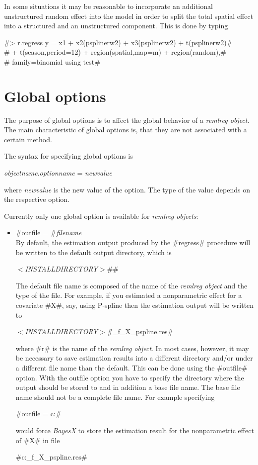 In some situations it may be reasonable to incorporate  an
additional unstructured  random effect into the model in order to
split the total spatial effect into a structured and an
unstructured component. This is done by typing

#> r.regress y = x1 + x2(psplinerw2) + x3(psplinerw2) + t(psplinerw2)#\\
#  + t(season,period=12) + region(spatial,map=m) + region(random),#\\
#  family=binomial using test#

\section{Global options}
\label{remlregglobopt} 

The purpose of global options is to affect the global behavior of
a {\em remlreg object}. The main characteristic of global options
is, that they are not associated with a certain method.

The syntax for specifying global options is

{\em objectname}.{\em optionname} = {\em newvalue}

where {\em newvalue} is the new value of the option. The type of
the value depends on the respective option.

Currently only one global option is available for {\em remlreg
objects}:

\begin{itemize}
\item #outfile = #{\em filename} \\
By default, the estimation output produced by the #regress#
procedure will be written to the default output directory, which
is

{\em$<$INSTALLDIRECTORY$>$}#\output#

The default file name is composed of the name of the {\em remlreg
object} and the type of the file. For example, if you estimated a
nonparametric effect for a covariate #X#, say, using P-spline then
the estimation output will be written to

{\em$<$INSTALLDIRECTORY$>$}#\output\r_f_X_pspline.res#

where #r# is the name of the {\em remlreg object}. In most cases,
however, it may be necessary to save estimation results into a
different directory and/or under a different file name than the
default. This can be done using the #outfile# option. With the
outfile option you have to specify the directory where the output
should be stored to and in addition a base file name. The base
file name should not be a complete file name. For example
specifying

#outfile = c:\data{}#

would force {\em BayesX} to store the estimation result for the
nonparametric effect of #X# in file

#c:\data{}_f_X_pspline.res#
\end{itemize}

